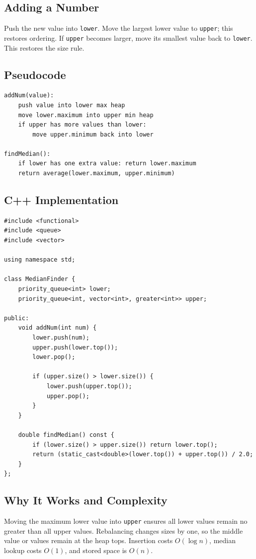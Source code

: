 \subsection{Adding a Number}
Push the new value into \texttt{lower}. Move the largest lower value to
\texttt{upper}; this restores ordering. If \texttt{upper} becomes larger, move
its smallest value back to \texttt{lower}. This restores the size rule.

\subsection{Pseudocode}
\begin{lstlisting}[style=pseudocode]
addNum(value):
    push value into lower max heap
    move lower.maximum into upper min heap
    if upper has more values than lower:
        move upper.minimum back into lower

findMedian():
    if lower has one extra value: return lower.maximum
    return average(lower.maximum, upper.minimum)
\end{lstlisting}

\subsection{C++ Implementation}
\begin{lstlisting}[style=compactcode,caption={Complete C++ data structure: MedianFinder}]
#include <functional>
#include <queue>
#include <vector>

using namespace std;

class MedianFinder {
    priority_queue<int> lower;
    priority_queue<int, vector<int>, greater<int>> upper;

public:
    void addNum(int num) {
        lower.push(num);
        upper.push(lower.top());
        lower.pop();

        if (upper.size() > lower.size()) {
            lower.push(upper.top());
            upper.pop();
        }
    }

    double findMedian() const {
        if (lower.size() > upper.size()) return lower.top();
        return (static_cast<double>(lower.top()) + upper.top()) / 2.0;
    }
};
\end{lstlisting}

\subsection{Why It Works and Complexity}
Moving the maximum lower value into \texttt{upper} ensures all lower values
remain no greater than all upper values. Rebalancing changes sizes by one, so
the middle value or values remain at the heap tops. Insertion costs
\(O(\log n)\), median lookup costs \(O(1)\), and stored space is \(O(n)\).

